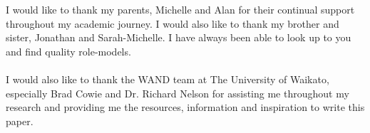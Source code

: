 I would like to thank my parents, Michelle and Alan for their continual support throughout my academic journey. I would also like to thank my brother and sister, Jonathan and Sarah-Michelle. I have always been able to look up to you and find quality role-models.\\\\
I would also like to thank the WAND team at The University of Waikato, especially Brad Cowie and Dr. Richard Nelson for assisting me throughout my research and providing me the resources, information and inspiration to write this paper.\\\\